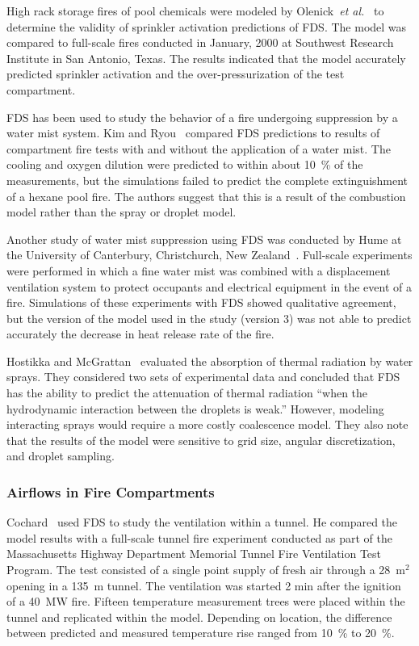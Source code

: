 High rack storage fires of pool chemicals were modeled by Olenick~{\em et  al.}~\cite{Olenick:1}  to  determine  the  validity  of  sprinkler
activation predictions  of FDS.  The model was  compared to full-scale fires conducted  in January, 2000  at Southwest Research  Institute in San
Antonio,  Texas.  The results indicated that  the model accurately predicted sprinkler activation and the over-pressurization of the test
compartment.

FDS  has  been  used  to  study  the behavior  of  a  fire  undergoing suppression     by     a    water     mist     system.     Kim     and
Ryou~\cite{Kim:BE2003,Kim:IJACR2004}   compared  FDS   predictions  to results of compartment fire tests  with and without the application of a water
mist. The cooling and oxygen dilution were predicted to within about 10~\% of the measurements, but the simulations failed to predict the complete
extinguishment of a hexane pool fire. The authors suggest that this is a result of the combustion model rather than the spray or droplet model.

Another study  of water  mist suppression using  FDS was  conducted by Hume   at   the    University   of   Canterbury,   Christchurch,   New
Zealand~\cite{Hume:Masters}. Full-scale  experiments were performed in which a fine  water mist was combined with  a displacement ventilation system
to protect occupants and electrical equipment in the event of a fire.  Simulations of  these experiments  with FDS  showed qualitative agreement, but
the version of the  model used in the study (version 3) was not able  to predict accurately the decrease  in heat release rate of the fire.

Hostikka    and   McGrattan~\cite{Hostikka:FSJ2006}    evaluated   the absorption of  thermal radiation by water sprays.  They considered two sets of
experimental data and concluded  that FDS has  the ability to predict the  attenuation of thermal radiation  ``when the hydrodynamic interaction
between   the  droplets  is   weak.''  However,  modeling interacting sprays would require a more costly coalescence model. They also note that  the
results of the model were  sensitive to grid size, angular discretization, and droplet sampling.

\subsubsection{Airflows in Fire Compartments}

Cochard~\cite{Cochard:1} used  FDS to  study the ventilation  within a tunnel. He  compared the model  results with a full-scale  tunnel fire
experiment conducted  as part of the  Massachusetts Highway Department Memorial Tunnel Fire Ventilation  Test Program.  The test consisted of a
single  point supply of  fresh air through  a 28~m$^2$ opening  in a 135~m tunnel.  The ventilation was started 2 min after the ignition of a  40~MW
fire.  Fifteen  temperature  measurement  trees were  placed within  the  tunnel and  replicated  within  the  model. Depending  on location,  the
difference between  predicted and  measured temperature rise ranged from 10~\% to 20~\%.

